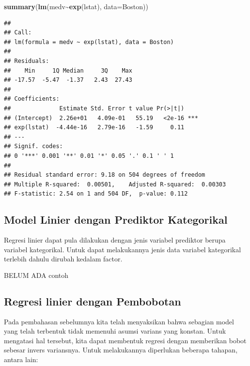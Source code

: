 \documentclass[
]{book}
\newenvironment{Shaded}{\begin{snugshade}}{\end{snugshade}}
\newcommand{\AttributeTok}[1]{\textcolor[rgb]{0.13,0.29,0.53}{#1}}
\newcommand{\FunctionTok}[1]{\textcolor[rgb]{0.13,0.29,0.53}{\textbf{#1}}}
\newcommand{\NormalTok}[1]{#1}
\newcommand{\SpecialCharTok}[1]{\textcolor[rgb]{0.81,0.36,0.00}{\textbf{#1}}}
\theoremstyle{definition}
\theoremstyle{definition}
\theoremstyle{definition}
\theoremstyle{definition}
\theoremstyle{remark}
\begin{document}
\begin{Shaded}
\begin{Highlighting}[]
\FunctionTok{summary}\NormalTok{(}\FunctionTok{lm}\NormalTok{(medv}\SpecialCharTok{\textasciitilde{}}\FunctionTok{exp}\NormalTok{(lstat), }\AttributeTok{data=}\NormalTok{Boston))}
\end{Highlighting}
\end{Shaded}

\begin{verbatim}
## 
## Call:
## lm(formula = medv ~ exp(lstat), data = Boston)
## 
## Residuals:
##    Min     1Q Median     3Q    Max 
## -17.57  -5.47  -1.37   2.43  27.43 
## 
## Coefficients:
##              Estimate Std. Error t value Pr(>|t|)    
## (Intercept)  2.26e+01   4.09e-01   55.19   <2e-16 ***
## exp(lstat)  -4.44e-16   2.79e-16   -1.59     0.11    
## ---
## Signif. codes:  
## 0 '***' 0.001 '**' 0.01 '*' 0.05 '.' 0.1 ' ' 1
## 
## Residual standard error: 9.18 on 504 degrees of freedom
## Multiple R-squared:  0.00501,    Adjusted R-squared:  0.00303 
## F-statistic: 2.54 on 1 and 504 DF,  p-value: 0.112
\end{verbatim}

\hypertarget{model-linier-dengan-prediktor-kategorikal}{%
\subsection{Model Linier dengan Prediktor Kategorikal}\label{model-linier-dengan-prediktor-kategorikal}}

Regresi linier dapat pula dilakukan dengan jenis variabel prediktor berupa variabel kategorikal. Untuk dapat melakukannya jenis data variabel kategorikal terlebih dahulu dirubah kedalam factor.

BELUM ADA contoh

\hypertarget{wlr}{%
\subsection{Regresi linier dengan Pembobotan}\label{wlr}}

Pada pembahasan sebelumnya kita telah menyaksikan bahwa sebagian model yang telah terbentuk tidak memenuhi asumsi varians yang konstan. Untuk mengatasi hal tersebut, kita dapat membentuk regresi dengan memberikan bobot sebesar invers variansnya. Untuk melakukannya diperlukan beberapa tahapan, antara lain:
\end{document}
